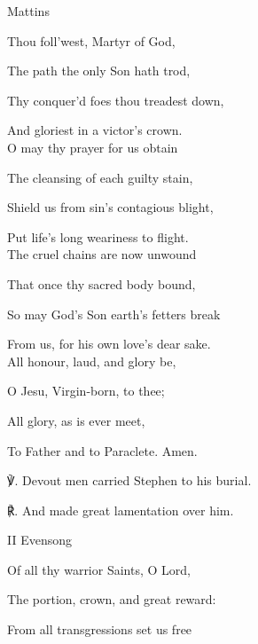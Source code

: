 \begin{paracol}{2}[]
\sloppy
\begin{inhead}
	Mattins
\end{inhead}
\begin{hangparas}{1.25em}{1}

Thou foll'west, Martyr of God,

The path the only Son hath trod,

Thy conquer'd foes thou treadest down,

And gloriest in a victor's crown.\\

O may thy prayer for us obtain

The cleansing of each guilty stain,

Shield us from sin's contagious blight,

Put life's long weariness to flight.\\

The cruel chains are now unwound

That once thy sacred body bound,

So may God's Son earth's fetters break

From us, for his own love's dear sake.\\

All honour, laud, and glory be,

O Jesu, Virgin-born, to thee;

All glory, as is ever meet,

To Father and to Paraclete. Amen.\\
\end{hangparas}

℣. Devout men carried Stephen to his burial.

℟. And made great lamentation over him.


\switchcolumn

\begin{inhead}
	II Evensong
\end{inhead}

\begin{hangparas}{1.25em}{1}

Of all thy warrior Saints, O Lord,

The portion, crown, and great reward:

From all transgressions set us free


\end{hangparas}
\end{paracol}
